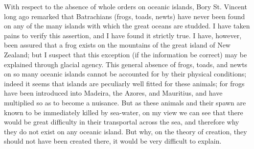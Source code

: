 \indent With respect to the absence of whole orders on oceanic islands, Bory St. Vincent long ago remarked that Batrachians (frogs, toads, newts) have never been found on any of the many islands with which the great oceans are studded. I have taken pains to verify this assertion, and I have found it strictly true. I have, however, been assured that a frog exists on the mountains of the great island of New Zealand; but I suspect that this exception (if the information be correct) may be explained through glacial agency. This general absence of frogs, toads, and newts on so many oceanic islands cannot be accounted for by their physical conditions; indeed it seems that islands are peculiarly well fitted for these animals; for frogs have been introduced into Madeira, the Azores, and Mauritius, and have multiplied so as to become a nuisance.  But as these animals and their spawn are known to be immediately killed by sea-water, on my view we can see that there would be great difficulty in their transportal across the sea, and therefore why they do not exist on any oceanic island. But why, on the theory of creation, they should not have been created there, it would be very difficult to explain.~\\
